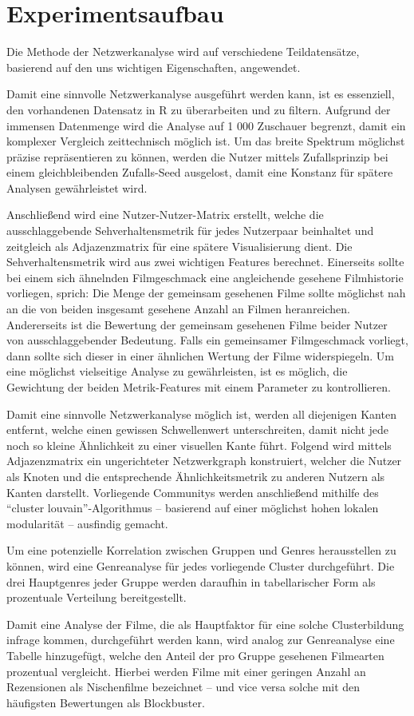 \section{Experimentsaufbau}

Die Methode der Netzwerkanalyse wird auf verschiedene Teildatensätze, basierend auf den uns wichtigen Eigenschaften, angewendet.

Damit eine sinnvolle Netzwerkanalyse ausgeführt werden kann, ist es essenziell, den vorhandenen Datensatz in R zu überarbeiten und zu filtern.
Aufgrund der immensen Datenmenge wird die Analyse auf 1 000 Zuschauer begrenzt, damit ein komplexer Vergleich zeittechnisch möglich ist.
Um das breite Spektrum möglichst präzise repräsentieren zu können, werden die Nutzer mittels Zufallsprinzip bei einem gleichbleibenden Zufalls-Seed ausgelost, damit eine Konstanz für spätere Analysen gewährleistet wird.

Anschließend wird eine Nutzer-Nutzer-Matrix erstellt, welche die ausschlaggebende Sehverhaltensmetrik für jedes Nutzerpaar beinhaltet und zeitgleich als Adjazenzmatrix für eine spätere Visualisierung dient.
Die Sehverhaltensmetrik wird aus zwei wichtigen Features berechnet.
Einerseits sollte bei einem sich ähnelnden Filmgeschmack eine angleichende gesehene Filmhistorie vorliegen, sprich: Die Menge der gemeinsam gesehenen Filme sollte möglichst nah an die von beiden insgesamt gesehene Anzahl an Filmen heranreichen.
Andererseits ist die Bewertung der gemeinsam gesehenen Filme beider Nutzer von ausschlaggebender Bedeutung.
Falls ein gemeinsamer Filmgeschmack vorliegt, dann sollte sich dieser in einer ähnlichen Wertung der Filme widerspiegeln.
Um eine möglichst vielseitige Analyse zu gewährleisten, ist es möglich, die Gewichtung der beiden Metrik-Features mit einem Parameter zu kontrollieren.

Damit eine sinnvolle Netzwerkanalyse möglich ist, werden all diejenigen Kanten entfernt, welche einen gewissen Schwellenwert unterschreiten, damit nicht jede noch so kleine Ähnlichkeit zu einer visuellen Kante führt.
Folgend wird mittels Adjazenzmatrix ein ungerichteter Netzwerkgraph konstruiert, welcher die Nutzer als Knoten und die entsprechende Ähnlichkeitsmetrik zu anderen Nutzern als Kanten darstellt.
Vorliegende Communitys werden anschließend mithilfe des \enquote{cluster louvain}-Algorithmus -- basierend auf einer möglichst hohen lokalen modularität -- ausfindig gemacht.

Um eine potenzielle Korrelation zwischen Gruppen und Genres herausstellen zu können, wird eine Genreanalyse für jedes vorliegende Cluster durchgeführt.
Die drei Hauptgenres jeder Gruppe werden daraufhin in tabellarischer Form als prozentuale Verteilung bereitgestellt.

Damit eine Analyse der Filme, die als Hauptfaktor für eine solche Clusterbildung infrage kommen, durchgeführt werden kann, wird analog zur Genreanalyse eine Tabelle hinzugefügt, welche den Anteil der pro Gruppe gesehenen Filmearten prozentual vergleicht.
Hierbei werden Filme mit einer geringen Anzahl an Rezensionen als Nischenfilme bezeichnet -- und vice versa solche mit den häufigsten Bewertungen als Blockbuster.
